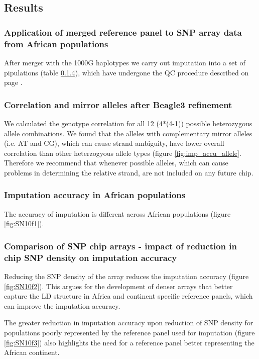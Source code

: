 \subsection{Results}

\subsubsection{Application of merged reference panel to SNP array data from African populations}
After merger with the 1000G haplotypes we carry out imputation into a set of pipulations (table \ref{}), which have undergone the QC procedure described on page \pageref{QCagvchip}.

\subsubsection{Correlation and mirror alleles after Beagle3 refinement}
We calculated the genotype correlation for all 12 (4*(4-1)) possible heterozygous allele combinations. We found that the alleles with complementary mirror alleles (i.e. AT and CG), which can cause strand ambiguity, have lower overall correlation than other heterzogyous allele types (figure \ref{fig:imp_accu_allele}. Therefore we recommend that whenever possible alleles, which can cause problems in determining the relative strand, are not included on any future chip.

\subsubsection{Imputation accuracy in African populations}
The accuracy of imputation is different across African populations (figure \ref{fig:SN10f1}).


\subsubsection{Comparison of SNP chip arrays - impact of reduction in chip SNP density on imputation accuracy}
Reducing the SNP density of the array reduces the imputation accuracy (figure \ref{fig:SN10f2}). This argues for the development of denser arrays that better capture the LD structure in Africa and continent specific reference panels, which can improve the imputation accuracy.


The greater reduction in imputation accuracy upon reduction of SNP density for populations poorly represented by the reference panel used for imputation (figure \ref{fig:SN10f3}) also highlights the need for a reference panel better representing the African continent.


